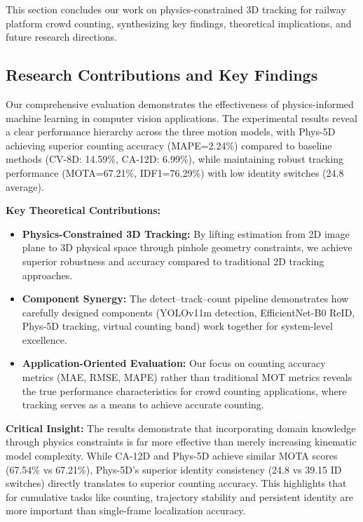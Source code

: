 This section concludes our work on physics-constrained 3D tracking for railway platform crowd counting, synthesizing key findings, theoretical implications, and future research directions.

\subsection{Research Contributions and Key Findings}

Our comprehensive evaluation demonstrates the effectiveness of physics-informed machine learning in computer vision applications. The experimental results reveal a clear performance hierarchy across the three motion models, with Phys-5D achieving superior counting accuracy (MAPE=2.24\%) compared to baseline methods (CV-8D: 14.59\%, CA-12D: 6.99\%), while maintaining robust tracking performance (MOTA=67.21\%, IDF1=76.29\%) with low identity switches (24.8 average).

\textbf{Key Theoretical Contributions:}
\begin{itemize}
    \item \textbf{Physics-Constrained 3D Tracking:} By lifting estimation from 2D image plane to 3D physical space through pinhole geometry constraints, we achieve superior robustness and accuracy compared to traditional 2D tracking approaches.
    \item \textbf{Component Synergy:} The detect–track–count pipeline demonstrates how carefully designed components (YOLOv11m detection, EfficientNet-B0 ReID, Phys-5D tracking, virtual counting band) work together for system-level excellence.
    \item \textbf{Application-Oriented Evaluation:} Our focus on counting accuracy metrics (MAE, RMSE, MAPE) rather than traditional MOT metrics reveals the true performance characteristics for crowd counting applications, where tracking serves as a means to achieve accurate counting.
\end{itemize}

\textbf{Critical Insight:} The results demonstrate that incorporating domain knowledge through physics constraints is far more effective than merely increasing kinematic model complexity. While CA-12D and Phys-5D achieve similar MOTA scores (67.54\% vs 67.21\%), Phys-5D's superior identity consistency (24.8 vs 39.15 ID switches) directly translates to superior counting accuracy. This highlights that for cumulative tasks like counting, trajectory stability and persistent identity are more important than single-frame localization accuracy.

